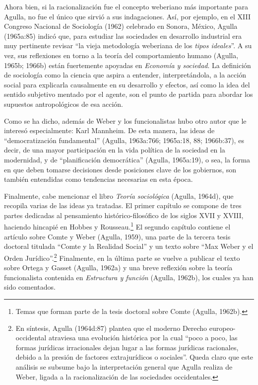 Ahora bien, si la racionalización fue el concepto weberiano más importante para Agulla, no fue el único que sirvió a sus indagaciones. Así, por ejemplo, en el XIII Congreso Nacional de Sociología (1962) celebrado en Sonora, México, Agulla (1965a:85) indicó que, para estudiar las sociedades en desarrollo industrial era muy pertinente revisar \enquote{la vieja metodología weberiana de los \emph{tipos ideales}}. A su vez, sus reflexiones en torno a la teoría del comportamiento humano (Agulla, 1965b; 1966b) están fuertemente apoyadas en \emph{Economía y sociedad}. La definición de sociología como la ciencia que aspira a entender, interpretándola, a la acción social para explicarla causalmente en su desarrollo y efectos, así como la idea del sentido subjetivo mentado por el agente, son el punto de partida para abordar los supuestos antropológicos de esa acción.

Como se ha dicho, además de Weber y los funcionalistas hubo otro autor que le interesó especialmente: Karl Mannheim. De esta manera, las ideas de \enquote{democratización fundamental} (Agulla, 1963a:766; 1965a:18, 88; 1966b:37), es decir, de una mayor participación en la vida política de la sociedad en la modernidad, y de \enquote{planificación democrática} (Agulla, 1965a:19), o sea, la forma en que deben tomarse decisiones desde posiciones clave de los gobiernos, son también entendidas como tendencias necesarias en esta época.

Finalmente, cabe mencionar el libro \emph{Teoría sociológica} (Agulla, 1964d), que recopila varias de las ideas ya tratadas. El primer capítulo se compone de tres partes dedicadas al pensamiento histórico-filosófico de los siglos XVII y XVIII, haciendo hincapié en Hobbes y Rousseau.\footnote{Temas que forman parte de la tesis doctoral sobre Comte (Agulla, 1962b).} El segundo capítulo contiene el artículo sobre Comte y Weber (Agulla, 1959), una parte de la tercera tesis doctoral titulada \enquote{Comte y la Realidad Social} y un texto sobre \enquote{Max Weber y el Orden Jurídico}.\footnote{En síntesis, Agulla (1964d:87) plantea que el moderno Derecho europeo-occidental atraviesa una evolución histórica por la cual \enquote{poco a poco, las formas jurídicas irracionales dejan lugar a las formas jurídicas racionales, debido a la presión de factores extrajurídicos o sociales}. Queda claro que este análisis se subsume bajo la interpretación general que Agulla realiza de Weber, ligada a la racionalización de las sociedades occidentales.} Finalmente, en la última parte se vuelve a publicar el texto sobre Ortega y Gasset (Agulla, 1962a) y una breve reflexión sobre la teoría funcionalista contenida en \emph{Estructura y función} (Agulla, 1962b), los cuales ya han sido comentados.

